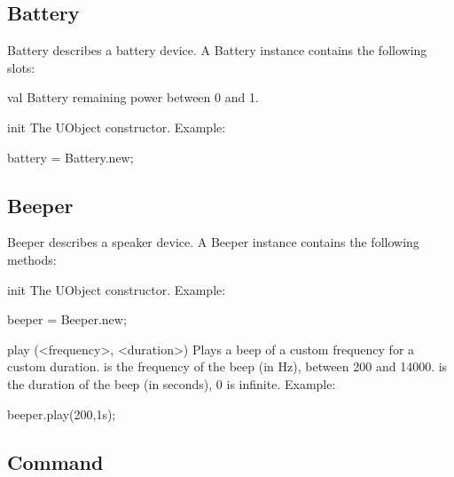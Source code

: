\subsection{Battery}

Battery describes a battery device. A Battery instance contains the
following slots:
\begin{urbiscriptapi}
\item[val] Battery remaining power between 0 and 1.
\item[init] The UObject constructor. Example:
\begin{urbiunchecked}
battery = Battery.new;
\end{urbiunchecked}
\end{urbiscriptapi}

\subsection{Beeper}

Beeper describes a speaker device. A Beeper instance contains the following
methods:

\begin{urbiscriptapi}
\item[init] The UObject constructor.  Example:
\begin{urbiunchecked}
beeper = Beeper.new;
\end{urbiunchecked}
\item[play](<frequency>, <duration>) Plays a beep of a custom frequency for
  a custom duration.   is the frequency of the beep (in Hz),
  between 200 and 14000.   is the duration of the beep (in
  seconds), 0 is infinite.  Example:
\begin{urbiunchecked}
beeper.play(200,1s);
\end{urbiunchecked}
\end{urbiscriptapi}

\subsection{Command}

